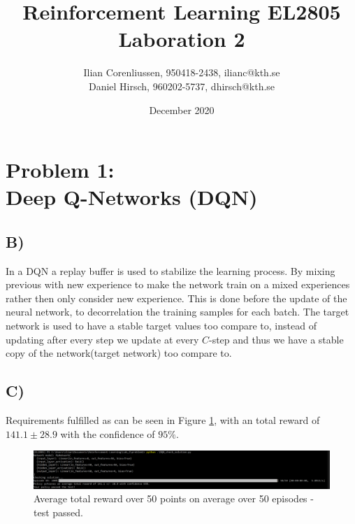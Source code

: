 \documentclass{article}
\title{Reinforcement Learning EL2805\\
       Laboration 2}
\author{Ilian Corenliussen, 950418-2438, ilianc@kth.se\\ 
        Daniel Hirsch, 960202-5737, dhirsch@kth.se}
\date{December 2020}
\begin{document}
\maketitle

\section*{Problem 1: \\
        Deep Q-Networks (DQN)}

\subsection*{B)} In a DQN a replay buffer is used to stabilize the learning process. By mixing previous with new experience to make the network train on a mixed experiences rather then only consider new experience. This is done before the update of the neural network, to decorrelation the training samples for each batch. The target network is used to have a stable target values too compare to, instead of updating after every step we update at every $C$-step and thus we have a stable copy of the network(target network) too compare to.

\subsection*{C)}
Requirements fulfilled as can be seen in Figure \ref{fig:passed_test}, with an total reward of $141.1 \pm 28.9$ with the confidence of $95 \%$.
\begin{figure}[H]
    \centering
    \includegraphics[width=1\textwidth]{Lab_2/problem1/images/passed_test.png}
    \caption{\small Average total reward over 50 points on average over 50 episodes - test passed. }
    \label{fig:passed_test}
\end{figure}
\end{document}
